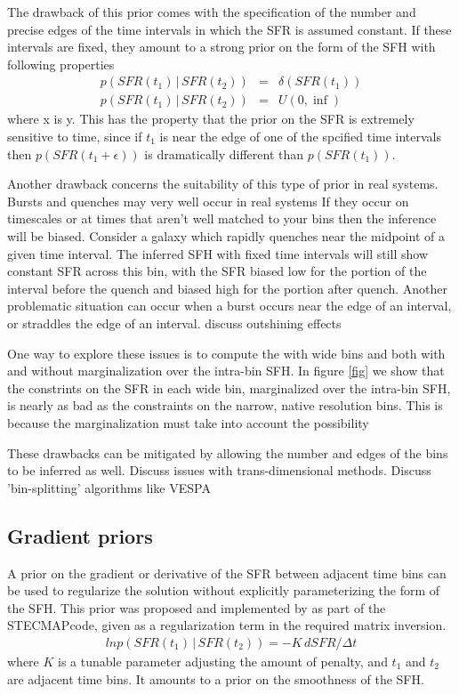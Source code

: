 \documentclass[iop,numberedappendix]{emulateapj}
\newcommand{\given}{\,|\,}
\newcommand{\stecmap}{\textsc{STECMAP}}
\newcommand{\vespa}{\textsc{VESPA}}
\begin{document}
The drawback of this prior comes with the specification of the number and precise edges of the time intervals in which the SFR is assumed constant.
If these intervals are fixed, they amount to a strong prior on the form of the SFH with following properties
\begin{eqnarray}
p(SFR(t_1) \given SFR(t_2)) & = & \delta(SFR(t_1)) \\
p(SFR(t_1) \given SFR(t_2)) & = & U(0, \inf)
\end{eqnarray}
where x is y.
This has the property that the prior on the SFR is extremely sensitive to time, since if $t_1$ is near the edge of one of the spcified time intervals then $p(SFR(t_1+\epsilon))$ is dramatically different than $p(SFR(t_1))$.

Another drawback concerns the suitability of this type of prior in real systems.  
Bursts and quenches may very well occur in real systems
If they occur on timescales or at times that aren't well matched to your bins then the inference will be biased.
Consider a galaxy which rapidly quenches near the midpoint of a given time interval.  
The inferred SFH with fixed time intervals will still show constant SFR across this bin, with the SFR biased low for the portion of the interval before the quench and biased high for the portion after quench.
Another problematic situation can occur when a burst occurs near the edge of an interval, or straddles the edge of an interval.
{\color{blue} discuss outshining effects}

One way to explore these issues is to compute the \crbound with wide bins and both with and without marginalization over the intra-bin SFH.
In figure \ref{fig} we show that the constrints on the SFR in each wide bin, marginalized over the intra-bin SFH, is nearly as bad as the constraints on the narrow, native resolution bins.
This is because the marginalization must take into account the possibility 

These drawbacks can be mitigated by allowing the number and edges of the bins to be inferred as well.
{\color{blue} Discuss issues with trans-dimensional methods.  Discuss 'bin-splitting' algorithms like \vespa}

\subsection{Gradient priors}
A prior on the gradient or derivative of the SFR between adjacent time bins can be used to regularize the solution without explicitly parameterizing the form of the SFH.
This prior was proposed and implemented by \citet{stecmap} as part of the \stecmap code, given as a regularization term in the required matrix inversion.
\begin{eqnarray}
ln p(SFR(t_1) \given SFR(t_2)) =  - K \, dSFR/\Delta t
\end{eqnarray}
where $K$ is a tunable parameter adjusting the amount of penalty, and $t_1$ and $t_2$ are adjacent time bins.
It amounts to a prior on the smoothness of the SFH.
\end{document}
